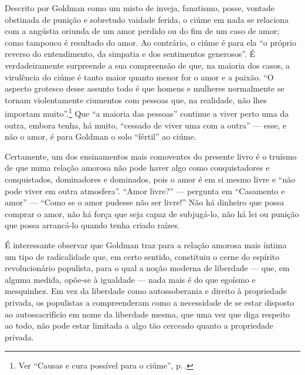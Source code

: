 Descrito por Goldman como um misto de inveja, fanatismo, posse,
vontade obstinada de punição e sobretudo vaidade ferida, o ciúme em
nada se relaciona com a angústia oriunda de um amor perdido ou
do fim de um caso de amor; como tampouco é resultado do amor. Ao
contrário, o ciúme é para ela ``o próprio reverso do entendimento, da
simpatia e dos sentimentos generosos''. É verdadeiramente surpreende a
sua compreensão de que, na maioria dos casos, a virulência do ciúme é
tanto maior quanto menor for o amor e a paixão. ``O aspecto grotesco
desse assunto todo é que homens e mulheres normalmente se tornam violentamente
ciumentos com pessoas que, na realidade, não lhes importam muito''.\footnote{Ver ``Causas e cura possível para o ciúme'', p.\,\pageref{ciume}.} Que
``a maioria das pessoas'' continue a viver perto uma da outra, embora
tenha, há muito, ``cessado de viver uma com a outra'' --- esse, e não o
amor, é para Goldman o solo ``fértil'' ao ciúme.

Certamente, um dos ensinamentos mais comoventes do presente livro é o
truísmo de que numa relação amorosa não pode haver algo como
conquistadores e conquistados, dominadores e dominados, pois o amor é em
si mesmo livre e ``não pode viver em outra atmosfera''. ``Amor livre?''
--- pergunta em ``Casamento e amor'' --- ``Como se o amor pudesse não ser
livre!'' Não há dinheiro que possa comprar o amor, não há força que seja
capaz de subjugá-lo, não há lei ou punição que possa arrancá-lo quando
tenha criado raízes.

É interessante observar que Goldman traz para a
relação amorosa mais íntima um tipo de radicalidade que, em certo
sentido, constituiu o cerne do espírito revolucionário populista, para o
qual a noção moderna de liberdade --- que, em alguma medida,
opõe-se à igualdade --- nada mais é do que egoísmo e mesquinhez. Em vez
da liberdade como autossoberania e direito à propriedade privada, os
populistas a compreenderam como a necessidade de se estar disposto ao
autossacrifício em nome da liberdade mesma, que uma vez que diga
respeito ao todo, não pode estar limitada a algo tão cerceado quanto a
propriedade privada.

